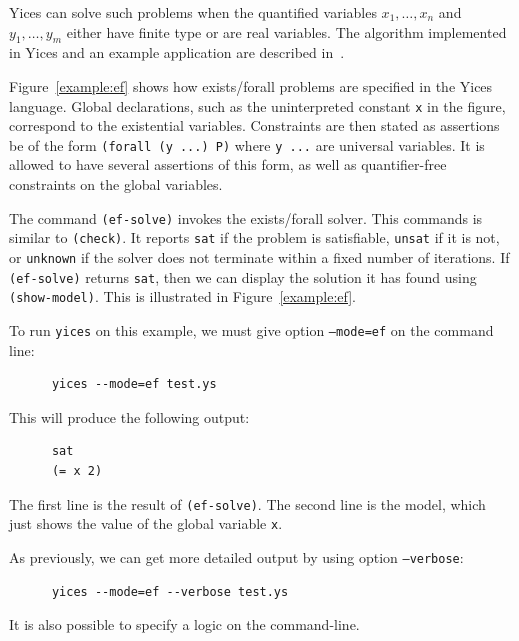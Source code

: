 \documentclass[11pt,twoside,fleqn,openright,titlepage]{cslreport}
\begin{document}
\medskip\noindent
Yices can solve such problems when the quantified variables
$x_1,\ldots,x_n$ and $y_1,\ldots,y_m$ either have finite type or are
real variables. The algorithm implemented in Yices and an example
application are described in~\cite{Gascon+etal:fmcad2014}.

\medskip\noindent Figure~\ref{example:ef} shows how exists/forall
problems are specified in the Yices language. Global declarations,
such as the uninterpreted constant \texttt{x} in the figure,
correspond to the existential variables.  Constraints are then stated
as assertions be of the form \texttt{(forall (y ...) P)} where
\texttt{y ...} are universal variables. It is allowed to have several
assertions of this form, as well as quantifier-free constraints on the
global variables.

\medskip\noindent
The command \texttt{(ef-solve)} invokes the exists/forall solver. This
commands is similar to \texttt{(check)}. It reports \texttt{sat} if
the problem is satisfiable, \texttt{unsat} if it is not, or
\texttt{unknown} if the solver does not terminate within a fixed
number of iterations. If \texttt{(ef-solve)} returns \texttt{sat},
then we can display the solution it has found using \texttt{(show-model)}.
This is illustrated in Figure~\ref{example:ef}.

\medskip\noindent
To run \texttt{yices} on this example, we must give option
\texttt{--mode=ef} on the command line:
\begin{small}
\begin{verbatim}
      yices --mode=ef test.ys
\end{verbatim}
\end{small}
This will produce the following output:
\begin{small}
\begin{verbatim}
      sat
      (= x 2)
\end{verbatim}
\end{small}
The first line is the result of \texttt{(ef-solve)}. The second line
is the model, which just shows the value of the global variable
\texttt{x}. 

\medskip\noindent
As previously, we can get more detailed output by using
option \texttt{--verbose}:
\begin{small}
\begin{verbatim}
      yices --mode=ef --verbose test.ys
\end{verbatim}
\end{small}
It is also possible to specify a logic on the command-line.
\end{document}
